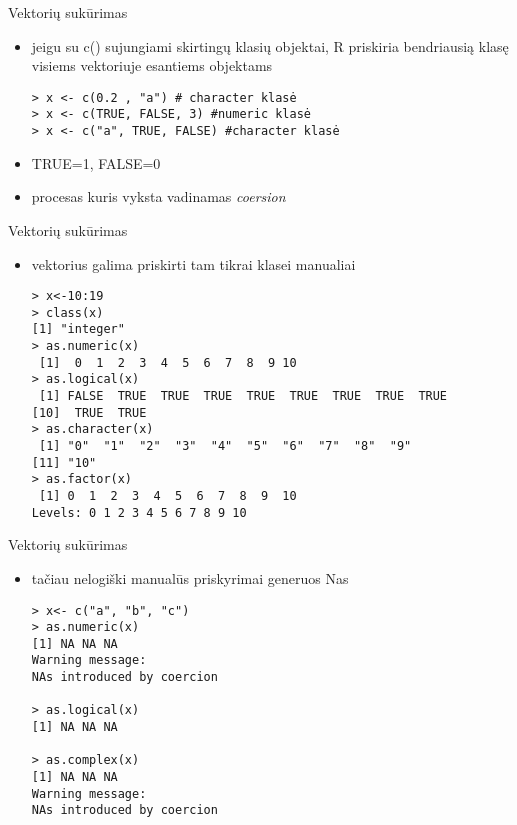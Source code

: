 \documentclass[11pt,xcolor=table]{beamer}
\begin{document}

\begin{frame}[fragile]{Vektorių sukūrimas}
\begin{itemize}
\item jeigu su c() sujungiami skirtingų klasių objektai, R priskiria bendriausią klasę visiems vektoriuje esantiems objektams
\begin{lstlisting}
> x <- c(0.2 , "a") # character klasė
> x <- c(TRUE, FALSE, 3) #numeric klasė
> x <- c("a", TRUE, FALSE) #character klasė
\end{lstlisting}
\item TRUE=1, FALSE=0
\item procesas kuris vyksta vadinamas \textit{coersion}
\end{itemize}
\end{frame}


\begin{frame}[fragile]{Vektorių sukūrimas}
\begin{itemize}
\item vektorius galima priskirti tam tikrai klasei manualiai
\begin{lstlisting}
> x<-10:19
> class(x)
[1] "integer"
> as.numeric(x)
 [1]  0  1  2  3  4  5  6  7  8  9 10
> as.logical(x)
 [1] FALSE  TRUE  TRUE  TRUE  TRUE  TRUE  TRUE  TRUE  TRUE
[10]  TRUE  TRUE
> as.character(x)
 [1] "0"  "1"  "2"  "3"  "4"  "5"  "6"  "7"  "8"  "9" 
[11] "10"
> as.factor(x)
 [1] 0  1  2  3  4  5  6  7  8  9  10
Levels: 0 1 2 3 4 5 6 7 8 9 10
\end{lstlisting}
\end{itemize}
\end{frame}


\begin{frame}[fragile]{Vektorių sukūrimas}
\begin{itemize}
\item tačiau nelogiški manualūs priskyrimai generuos Nas
\begin{lstlisting}
> x<- c("a", "b", "c")
> as.numeric(x)
[1] NA NA NA
Warning message:
NAs introduced by coercion 

> as.logical(x)
[1] NA NA NA

> as.complex(x)
[1] NA NA NA
Warning message:
NAs introduced by coercion 
\end{lstlisting}
\end{itemize}
\end{frame}
\end{document}
